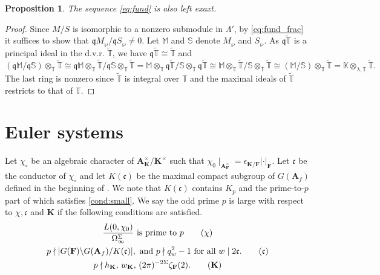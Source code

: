 \documentclass[leqno]{amsart}
\newcommand{\TT}{\mathbb{T}} %
\newcommand{\A}{\mathbf A}
\newcommand{\F}{{\mathbf{F}}} %
\newcommand{\K}{{\mathbf{K}}} %
\newcommand{\qch}{\epsilon} %
\newcommand{\fc}{\mathfrak{c}}
\newcommand{\fq}{\mathfrak{q}}
\newtheorem{prop}[thm]{Proposition}
\theoremstyle{definition}
\theoremstyle{remark}
\begin{document}
\begin{prop}
	The sequence \eqref{eq:fund} is also left exaxt.
\end{prop}
\begin{proof}
	Since $M/S$ is isomorphic to a nonzero submodule 
	in  $\Lambda'$,
	by \eqref{eq:fund_frac} it suffices to show that 
	$\fq M_\wp/\fq S_\wp\neq 0$.
	Let $\mathbb{M}$ and  $\mathbb{S}$
	denote  $M_\wp$ and $S_\wp$.
	As $\fq\tilde{\TT}$ is a principal ideal
	in the d.v.r. $\tilde{\TT}$,
	we have $\fq\tilde{\TT}\cong \tilde{\TT}$ and 
\[
	(\fq \mathbb{M}/\fq \mathbb{S})\otimes_\TT
	\tilde{\TT}\cong
	\fq\mathbb{M}\otimes_\TT\tilde{\TT}/
	\fq\mathbb{S}\otimes_\TT\tilde{\TT}=
	\mathbb{M}\otimes_\TT\fq\tilde{\TT}/
	\mathbb{S}\otimes_\TT\fq\tilde{\TT} \cong 
	\mathbb{M}\otimes_\TT\tilde{\TT}/
	\mathbb{S}\otimes_\TT\tilde{\TT}\cong
	(\mathbb{M}/\mathbb{S})\otimes_\TT\tilde{\TT}=
	\mathbb{K}\otimes_{\lambda,\TT}\tilde{\TT}.
\]
The last ring is nonzero since 
$\tilde{\TT}$ is integral over $\TT$
and the maximal ideals of  $ \tilde{\TT}$ 
restricts to that of $\TT$.
\end{proof}

\section{Euler systems}


Let $\chi_\circ$ be an algebraic 
character of $\A_{\K}^\times/\K^\times$
such that $\chi_0\mid_{\A_\F^\times}=\qch_{\K/\F}|\cdot|_\F$.
Let $\fc$ be the conductor of  $\chi_\circ$
and let $K(\fc)$ be the maximal compact subgroup
of $G(\A_f)$ defined in the beginning of \cite[\S 6]{lee}.
We note that $K(\fc)$ contains  $K_p$
and the prime-to-$p$ part of which 
satisfies \eqref{cond:small}.
We say the odd prime $p$ is large 
with respect to  $\chi, \fc$ and  $\K$
if the following conditions are satisfied.
\begin{gather}
	\frac{L(0,\chi_0)}{\Omega_\infty^{\Sigma}}
	\text{ is prime to }p
	\label{cond:chi}\tag{$\chi$}\\
	p\nmid |G(\F)\backslash G(\A_f)/K(\fc)|,
	\text{ and }p\nmid q_w^2-1\text{ for all }w\mid 2\fc.
	\label{cond:fc}\tag{$\fc$}\\
	p\nmid h_\K, \, w_\K, \, (2\pi)^{-2\Sigma}\zeta_\F(2).
	\label{cond:K}\tag{$\K$}
\end{gather}
\end{document}
